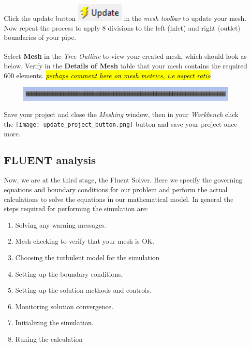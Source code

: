 \documentclass[11pt,a4paper,oneside]{scrartcl}
\newcommand\bfr[1]{\textcolor[rgb]{1,0.00,0.00}{\textbf{\textsf{#1}}}}
\begin{document}
Click the update button \includegraphics[width=1.cm]{update_button.png} in the \emph{mesh toolbar} to update your mesh. Now repeat the process to apply 8 divisions to the left (inlet) and right (outlet) boundaries of your pipe.
\\
\\
Select \bfr{Mesh} in the \emph{Tree Outline} to view your created mesh, which should look as below. Verify in the \bfr{Details of Mesh} table that your mesh contains the required 600 elements.
\hl{\emph{perhaps comment here on mesh metrics, i.e aspect ratio}}

\begin{figure}[H]
\begin{center}
\includegraphics[width=1.0\textwidth,clip]{laminar_mesh.png}
\end{center}
\end{figure}

Save your project and close the \emph{Meshing} window, then in your \emph{Workbench} click the \texttt{[image: update\_project\_button.png]} button and save your project once more.

\FloatBarrier
\subsection{FLUENT analysis}
Now, we are at the third stage, the Fluent Solver. Here we specify the governing equations and boundary conditions for our problem and perform the actual calculations to solve the equations in our mathematical model.
In general the steps required for performing the simulation are:
\begin{enumerate}
    \item	Solving any warning messages.
    \item	Mesh checking to verify that your mesh is OK.
    \item	Choosing the turbulent model for the simulation
    \item	Setting up the boundary conditions.
    \item   Setting up the solution methods and controls.
    \item	Monitoring solution convergence.
    \item	Initializing the simulation.
    \item	Runing the calculation
\end{enumerate}
\end{document}
